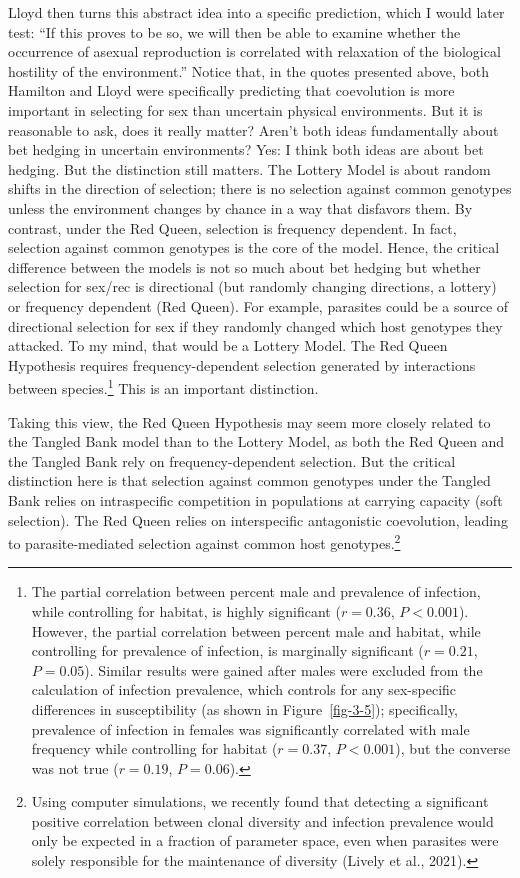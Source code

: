 \documentclass[
  letterpaper,
]{book}
\begin{document}
Lloyd then turns this abstract idea into a specific prediction, which I
would later test: ``If this proves to be so, we will then be able to
examine whether the occurrence of asexual reproduction is correlated
with relaxation of the biological hostility of the environment.'' Notice
that, in the quotes presented above, both Hamilton and Lloyd were
specifically predicting that coevolution is more important in selecting
for sex than uncertain physical environments. But it is reasonable to
ask, does it really matter? Aren't both ideas fundamentally about bet
hedging in uncertain environments? Yes: I think both ideas are about bet
hedging. But the distinction still matters. The Lottery Model is about
random shifts in the direction of selection; there is no selection
against common genotypes unless the environment changes by chance in a
way that disfavors them. By contrast, under the Red Queen, selection is
frequency dependent. In fact, selection against common genotypes is the
core of the model. Hence, the critical difference between the models is
not so much about bet hedging but whether selection for sex/rec is
directional (but randomly changing directions, a lottery) or frequency
dependent (Red Queen). For example, parasites could be a source of
directional selection for sex if they randomly changed which host
genotypes they attacked. To my mind, that would be a Lottery Model. The
Red Queen Hypothesis requires frequency-dependent selection generated by
interactions between species.\footnote{The partial correlation between
  percent male and prevalence of infection, while controlling for
  habitat, is highly significant (\(r = 0.36\), \(P < 0.001\)). However,
  the partial correlation between percent male and habitat, while
  controlling for prevalence of infection, is marginally significant
  (\(r = 0.21\), \(P = 0.05\)). Similar results were gained after males
  were excluded from the calculation of infection prevalence, which
  controls for any sex-specific differences in susceptibility (as shown
  in Figure~\ref{fig-3-5}); specifically, prevalence of infection in
  females was significantly correlated with male frequency while
  controlling for habitat (\(r = 0.37\), \(P < 0.001\)), but the
  converse was not true (\(r = 0.19\), \(P = 0.06\)).} This is an
important distinction.

Taking this view, the Red Queen Hypothesis may seem more closely related
to the Tangled Bank model than to the Lottery Model, as both the Red
Queen and the Tangled Bank rely on frequency-dependent selection. But
the critical distinction here is that selection against common genotypes
under the Tangled Bank relies on intraspecific competition in
populations at carrying capacity (soft selection). The Red Queen relies
on interspecific antagonistic coevolution, leading to parasite-mediated
selection against common host genotypes.\footnote{Using computer
  simulations, we recently found that detecting a significant positive
  correlation between clonal diversity and infection prevalence would
  only be expected in a fraction of parameter space, even when parasites
  were solely responsible for the maintenance of diversity (Lively et
  al., 2021).}
\end{document}
